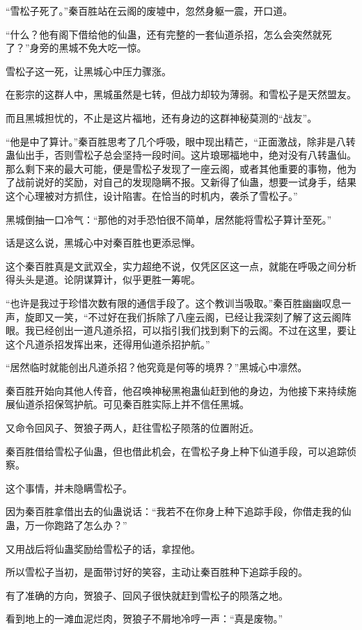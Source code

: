 \begin{this_body}
“雪松子死了。”秦百胜站在云阁的废墟中，忽然身躯一震，开口道。

“什么？他有阁下借给他的仙蛊，还有完整的一套仙道杀招，怎么会突然就死了？”身旁的黑城不免大吃一惊。

雪松子这一死，让黑城心中压力骤涨。

在影宗的这群人中，黑城虽然是七转，但战力却较为薄弱。和雪松子是天然盟友。

而且黑城担忧的，不止是这片福地，还有身边的这群神秘莫测的“战友”。

“他是中了算计。”秦百胜思考了几个呼吸，眼中现出精芒，“正面激战，除非是八转蛊仙出手，否则雪松子总会坚持一段时间。这片琅琊福地中，绝对没有八转蛊仙。那么剩下来的最大可能，便是雪松子发现了一座云阁，或者其他重要的事物，他为了战前说好的奖励，对自己的发现隐瞒不报。又新得了仙蛊，想要一试身手，结果这个心理被对方抓住，设计陷害。在恰当的时机内，袭杀了雪松子。”

黑城倒抽一口冷气：“那他的对手恐怕很不简单，居然能将雪松子算计至死。”

话是这么说，黑城心中对秦百胜也更添忌惮。

这个秦百胜真是文武双全，实力超绝不说，仅凭区区这一点，就能在呼吸之间分析得头头是道。论阴谋算计，似乎更胜一筹呢。

“也许是我过于珍惜次数有限的通信手段了。这个教训当吸取。”秦百胜幽幽叹息一声，旋即又一笑，“不过好在我们拆除了八座云阁，已经让我深刻了解了这云阁阵眼。我已经创出一道凡道杀招，可以指引我们找到剩下的云阁。不过在这里，要让这个凡道杀招发挥出来，还得用仙道杀招护航。”

“居然临时就能创出凡道杀招？他究竟是何等的境界？”黑城心中凛然。

秦百胜开始向其他人传音，他召唤神秘黑袍蛊仙赶到他的身边，为他接下来持续施展仙道杀招保驾护航。可见秦百胜实际上并不信任黑城。

又命令回风子、贺狼子两人，赶往雪松子陨落的位置附近。

秦百胜借给雪松子仙蛊，但也借此机会，在雪松子身上种下仙道手段，可以追踪侦察。

这个事情，并未隐瞒雪松子。

因为秦百胜拿借出去的仙蛊说话：“我若不在你身上种下追踪手段，你借走我的仙蛊，万一你跑路了怎么办？”

又用战后将仙蛊奖励给雪松子的话，拿捏他。

所以雪松子当初，是面带讨好的笑容，主动让秦百胜种下追踪手段的。

有了准确的方向，贺狼子、回风子很快就赶到雪松子的陨落之地。

看到地上的一滩血泥烂肉，贺狼子不屑地冷哼一声：“真是废物。”


\end{this_body}
